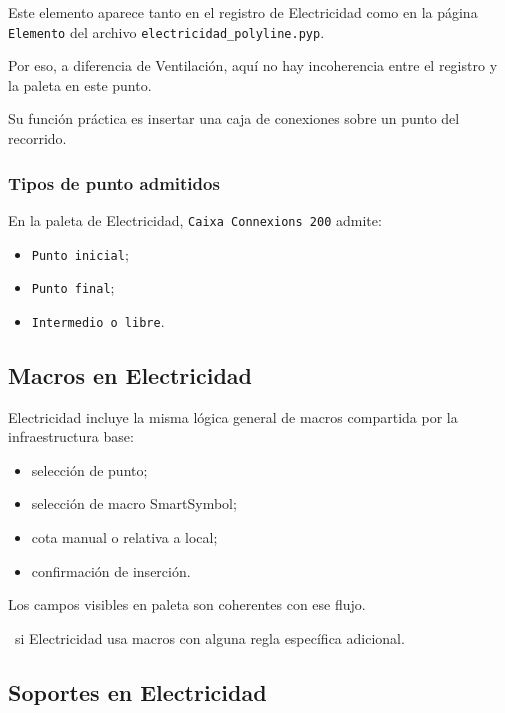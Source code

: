 Este elemento aparece tanto en el registro de Electricidad como en la página \texttt{Elemento} del archivo \texttt{electricidad\_polyline.pyp}.

Por eso, a diferencia de Ventilación, aquí no hay incoherencia entre el registro y la paleta en este punto.

Su función práctica es insertar una caja de conexiones sobre un punto del recorrido.


\subsubsection{Tipos de punto admitidos}

En la paleta de Electricidad, \texttt{Caixa Connexions 200} admite:

\begin{itemize}
\item \texttt{Punto inicial};
\item \texttt{Punto final};
\item \texttt{Intermedio o libre}.
\end{itemize}

\subsection{Macros en Electricidad}

Electricidad incluye la misma lógica general de macros compartida por la infraestructura base:

\begin{itemize}
\item selección de punto;
\item selección de macro SmartSymbol;
\item cota manual o relativa a local;
\item confirmación de inserción.
\end{itemize}

Los campos visibles en paleta son coherentes con ese flujo.

\pendingtag\ si Electricidad usa macros con alguna regla específica adicional.


\subsection{Soportes en Electricidad}

